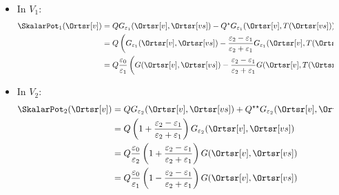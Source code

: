 \begin{frame}
\begin{columns}
\begin{column}{.35\textwidth}
\begin{tikzpicture}[line width = 1.2pt, line join=round,>=stealth]
\end{tikzpicture}
       \end{column}
       \begin{column}{.65\textwidth}
         \begin{itemize}[<+->]
           \item In $V_1$:
      \begin{align*}
        \SkalarPot_1(\Ortsr[v]) & = Q G_{\varepsilon_1}(\Ortsr[v], \Ortsr[vs]) -  Q^\star G_{\varepsilon_1}(\Ortsr[v], T(\Ortsr[vs]))\\
        & = Q\left( G_{\varepsilon_1}(\Ortsr[v], \Ortsr[vs]) -  \frac{\varepsilon_2-\varepsilon_1}{\varepsilon_2+\varepsilon_1} G_{\varepsilon_1}(\Ortsr[v], T(\Ortsr[vs]))\right)\\
        & = Q\frac{\varepsilon_0}{\varepsilon_1}\left( G(\Ortsr[v], \Ortsr[vs]) -  \frac{\varepsilon_2-\varepsilon_1}{\varepsilon_2+\varepsilon_1} G(\Ortsr[v], T(\Ortsr[vs]))\right)
        \end{align*}
    \item In $V_2$:
      \begin{align*}
        \SkalarPot_2(\Ortsr[v]) & = Q G_{\varepsilon_2}(\Ortsr[v], \Ortsr[vs]) +  Q^{\star\star} G_{\varepsilon_2}(\Ortsr[v], \Ortsr[vs])\\
                                       & = Q \left( 1 +  \frac{\varepsilon_2-\varepsilon_1}{\varepsilon_2+\varepsilon_1}\right) G_{\varepsilon_2}(\Ortsr[v], \Ortsr[vs]) \\
                                       & = Q\frac{\varepsilon_0}{\varepsilon_2} \left( 1 +  \frac{\varepsilon_2-\varepsilon_1}{\varepsilon_2+\varepsilon_1}\right) G(\Ortsr[v], \Ortsr[vs]) \\
                                       & = Q\frac{\varepsilon_0}{\varepsilon_1} \left( 1 -  \frac{\varepsilon_2-\varepsilon_1}{\varepsilon_2+\varepsilon_1}\right) G(\Ortsr[v], \Ortsr[vs]) 
      \end{align*}
          \end{itemize}
       \end{column}
     \end{columns}
\end{frame}      

